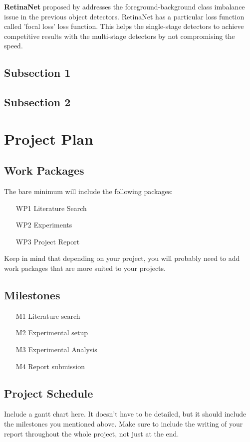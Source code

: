 \documentclass[thesis]{mas_proposal}
\begin{document}
\textbf{RetinaNet} proposed by \citet{lin2017focal} addresses the foreground-background class imbalance issue in the previous object detectors. RetinaNet has a particular loss function called 'focal loss' loss function. This helps the single-stage detectors to achieve competitive results with the multi-stage detectors by not compromising the speed.  

\subsection{Subsection 1}
\subsection{Subsection 2}



\section{Project Plan}

\subsection{Work Packages}
The bare minimum will include the following packages:
\begin{enumerate}
    \item[WP1] Literature Search
    \item[WP2] Experiments
    \item[WP3] Project Report
\end{enumerate}
Keep in mind that depending on your project, you will probably need to add work packages that are more suited to your projects.

\subsection{Milestones}
\begin{enumerate}
    \item[M1] Literature search
    \item[M2] Experimental setup
    \item[M3] Experimental Analysis
    \item[M4] Report submission
\end{enumerate}

\subsection{Project Schedule}
Include a gantt chart here. It doesn't have to be detailed, but it should include the milestones you mentioned above.
Make sure to include the writing of your report throughout the whole project, not just at the end.
\end{document}
